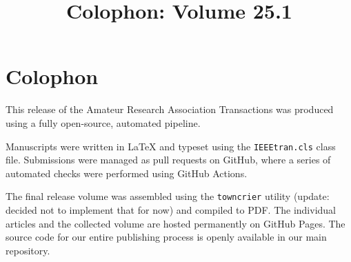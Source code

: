 \documentclass[conference, compsoc, 11pt]{IEEEtran}
\title{Colophon: Volume 25.1}
\author{
    \IEEEauthorblockN{Ivan Anishchuk}
    \IEEEauthorblockA{
        ivan@ivananishchuk.net https://ivananishchuk.work \\
	ORCID \orcidicon{0009-0008-8729-6137}: 0009-0008-8729-6137 %
    }
}
\begin{document}
\IEEEoverridecommandlockouts
{}

\maketitle

\IEEEpubidadjcol

\section*{Colophon}

This release of the Amateur Research Association Transactions was produced using a fully open-source, automated pipeline.

Manuscripts were written in LaTeX and typeset using the \texttt{IEEEtran.cls} class file. Submissions were managed as pull requests on GitHub, where a series of automated checks were performed using GitHub Actions.

The final release volume was assembled using the \texttt{towncrier} utility (update: decided not to implement that for now) and compiled to PDF. The individual articles and the collected volume are hosted permanently on GitHub Pages. The source code for our entire publishing process is openly available in our main repository.
\end{document}
